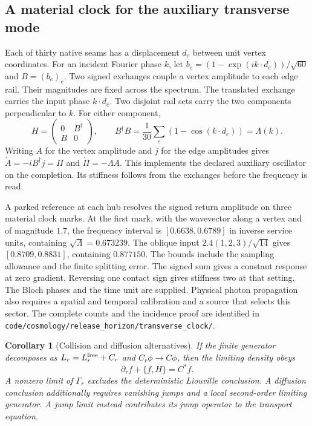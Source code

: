 \documentclass[11pt]{article}
\newtheorem{corollary}[theorem]{Corollary}
\theoremstyle{remark}
\begin{document}
\subsection{A material clock for the auxiliary transverse mode}
Each of thirty native seams has a displacement \(d_e\) between unit
vertex coordinates. For an incident Fourier phase \(k\), let
\(b_e=(1-\exp(i k\cdot d_e))/\sqrt{60}\) and \(B=(b_e)_e\).
Two signed exchanges couple a vertex amplitude to each edge rail. Their
magnitudes are fixed across the spectrum. The translated exchange carries
the input phase \(k\cdot d_e\). Two disjoint rail sets carry the two
components perpendicular to \(k\). For either component,
\[
 H=\begin{pmatrix}0&B^\dagger\\ B&0\end{pmatrix},
 \qquad B^\dagger B=\frac{1}{30}\sum_e(1-\cos(k\cdot d_e))=\Lambda(k).
\]
Writing \(A\) for the vertex amplitude and \(j\) for the edge amplitudes
gives \(\dot A=-iB^\dagger j=\Pi\) and \(\dot\Pi=-\Lambda A\).
This implements the declared auxiliary oscillator on the completion.
Its stiffness follows from the exchanges before the frequency is read.

A parked reference at each hub resolves the signed return amplitude on
three material clock marks. At the first mark, with the wavevector along
a vertex and of magnitude \(1.7\), the frequency interval is
\([0.6638,0.6789]\) in inverse service units, containing
\(\sqrt\Lambda=0.673239\). The oblique input \(2.4(1,2,3)/\sqrt{14}\)
gives \([0.8709,0.8831]\), containing \(0.877150\).
The bounds include the sampling allowance and the finite splitting error.
The signed sum gives a constant response at zero gradient. Reversing one
contact sign gives stiffness two at that setting. The Bloch phases and
the time unit are supplied. Physical photon propagation also requires a
spatial and temporal calibration and a source that selects this sector.
The complete counts and the incidence proof are identified in
\mbox{\nolinkurl{code/cosmology/release_horizon/transverse_clock/}}.

\begin{corollary}[Collision and diffusion alternatives]
If the finite generator decomposes as $L_r=L_r^{\rm free}+C_r$ and
$C_r\phi\to C\phi$, then the limiting density obeys
\[
\partial_\tau f+\{f,H\}=C^*f.
\]
A nonzero limit of $\Gamma_r$ excludes the deterministic Liouville
conclusion. A diffusion conclusion additionally requires vanishing jumps and
a local second-order limiting generator. A jump limit instead contributes
its jump operator to the transport equation.
\end{corollary}
\end{document}
